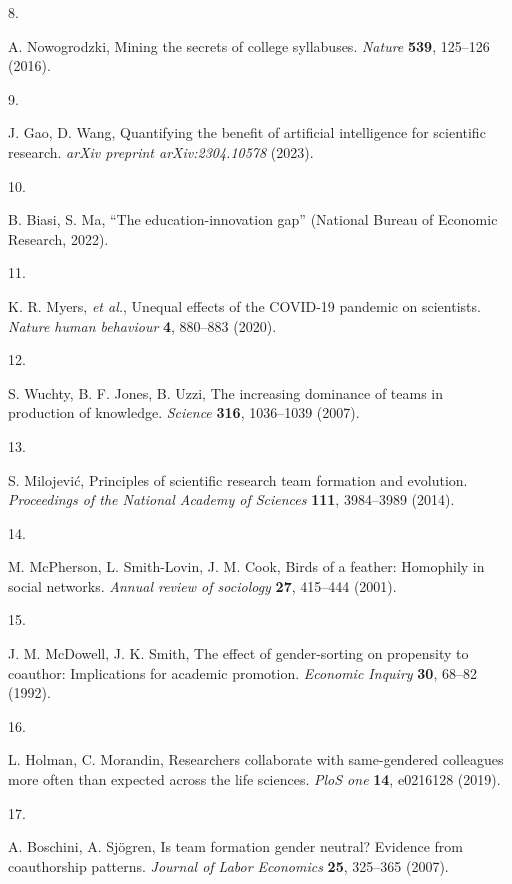 \documentclass[
  11pt, %
]{article}
\newlength{\cslhangindent}
\newlength{\csllabelwidth}
\newenvironment{CSLReferences}[2] %
 {\begin{list}{}{%
  \setlength{\itemindent}{0pt}
  \setlength{\leftmargin}{0pt}
  \setlength{\parsep}{0pt}
  \ifodd #1
   \setlength{\leftmargin}{\cslhangindent}
   \setlength{\itemindent}{-1\cslhangindent}
  \fi
  \setlength{\itemsep}{#2\baselineskip}}}
 {\end{list}}
\newcommand{\CSLLeftMargin}[1]{\parbox[t]{\csllabelwidth}{\strut#1\strut}}
\newcommand{\CSLRightInline}[1]{\parbox[t]{\linewidth - \csllabelwidth}{\strut#1\strut}}
\begin{document}
\begin{CSLReferences}{0}{1}
\CSLLeftMargin{8. }%
\CSLRightInline{A. Nowogrodzki, Mining the secrets of college syllabuses. \emph{Nature} \textbf{539}, 125--126 (2016).}

\CSLLeftMargin{9. }%
\CSLRightInline{J. Gao, D. Wang, Quantifying the benefit of artificial intelligence for scientific research. \emph{arXiv preprint arXiv:2304.10578} (2023).}

\CSLLeftMargin{10. }%
\CSLRightInline{B. Biasi, S. Ma, {``The education-innovation gap''} (National Bureau of Economic Research, 2022).}

\CSLLeftMargin{11. }%
\CSLRightInline{K. R. Myers, \emph{et al.}, Unequal effects of the COVID-19 pandemic on scientists. \emph{Nature human behaviour} \textbf{4}, 880--883 (2020).}

\CSLLeftMargin{12. }%
\CSLRightInline{S. Wuchty, B. F. Jones, B. Uzzi, The increasing dominance of teams in production of knowledge. \emph{Science} \textbf{316}, 1036--1039 (2007).}

\CSLLeftMargin{13. }%
\CSLRightInline{S. Milojević, Principles of scientific research team formation and evolution. \emph{Proceedings of the National Academy of Sciences} \textbf{111}, 3984--3989 (2014).}

\CSLLeftMargin{14. }%
\CSLRightInline{M. McPherson, L. Smith-Lovin, J. M. Cook, Birds of a feather: Homophily in social networks. \emph{Annual review of sociology} \textbf{27}, 415--444 (2001).}

\CSLLeftMargin{15. }%
\CSLRightInline{J. M. McDowell, J. K. Smith, The effect of gender-sorting on propensity to coauthor: Implications for academic promotion. \emph{Economic Inquiry} \textbf{30}, 68--82 (1992).}

\CSLLeftMargin{16. }%
\CSLRightInline{L. Holman, C. Morandin, Researchers collaborate with same-gendered colleagues more often than expected across the life sciences. \emph{PloS one} \textbf{14}, e0216128 (2019).}

\CSLLeftMargin{17. }%
\CSLRightInline{A. Boschini, A. Sjögren, Is team formation gender neutral? Evidence from coauthorship patterns. \emph{Journal of Labor Economics} \textbf{25}, 325--365 (2007).}


\end{CSLReferences}
\end{document}
